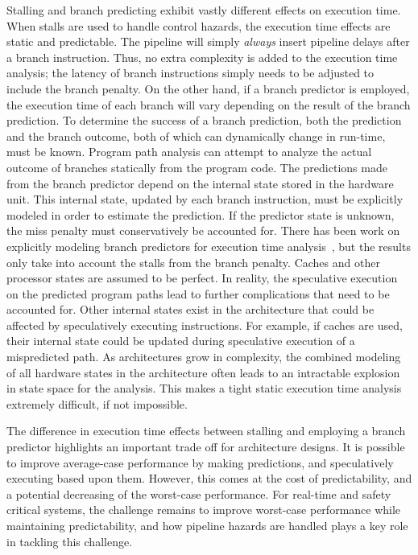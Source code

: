 Stalling and branch predicting exhibit vastly different effects on execution time.    
When stalls are used to handle control hazards, the execution time effects are static and predictable.   
The pipeline will simply \emph{always} insert pipeline delays after a branch instruction.
Thus, no extra complexity is added to the execution time analysis; the latency of branch instructions simply needs to be adjusted to include the branch penalty.
On the other hand, if a branch predictor is employed, the execution time of each branch will vary depending on the result of the branch prediction.  
To determine the success of a branch prediction, both the prediction and the branch outcome, both of which can dynamically change in run-time, must be known.   
Program path analysis can attempt to analyze the actual outcome of branches statically from the program code. 
The predictions made from the branch predictor depend on the internal state stored in the hardware unit.
This internal state, updated by each branch instruction, must be explicitly modeled in order to estimate the prediction. 
If the predictor state is unknown, the miss penalty must conservatively be accounted for.
There has been work on explicitly modeling branch predictors for execution time analysis~\cite{Mitra_branch_wcet_2002}, but the results only take into account the stalls from the branch penalty. 
Caches and other processor states are assumed to be perfect. 
In reality, the speculative execution on the predicted program paths lead to further complications that need to be accounted for.
Other internal states exist in the architecture that could be affected by speculatively executing instructions.
For example, if caches are used, their internal state could be updated during speculative execution of a mispredicted path.
As architectures grow in complexity, the combined modeling of all hardware states in the architecture often leads to an intractable explosion in state space for the analysis.    
This makes a tight static execution time analysis extremely difficult, if not impossible.

The difference in execution time effects between stalling and employing a branch predictor highlights an important trade off for architecture designs.    
It is possible to improve average-case performance by making predictions, and speculatively executing based upon them.
However, this comes at the cost of predictability, and a potential decreasing of the worst-case performance.  
For real-time and safety critical systems, the challenge remains to improve worst-case performance while maintaining predictability, and how pipeline hazards are handled plays a key role in tackling this challenge. 
 
